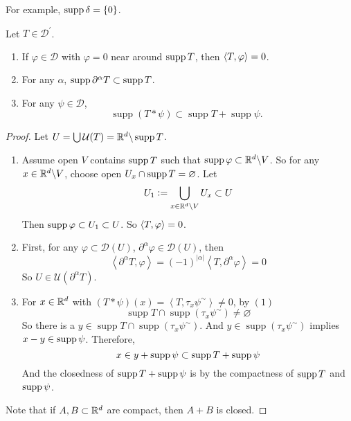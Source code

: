 \begin{enumerate}[label=\arabic*.]
	For example, $\operatorname{supp} \delta = \left\{0\right\}$.

	\begin{prop}
		Let $T \in \mathcal{D}^\prime$.
		\begin{enumerate}[label=(\arabic{*})]
			\item If $\varphi \in \mathcal{D}$ with $\varphi = 0$ near around $\operatorname{supp} T$, then $\langle T,\varphi \rangle = 0$.
			\item For any $\alpha$, $\operatorname{supp} \partial^\alpha T \subset \operatorname{supp} T$.
			\item For any $\psi \in \mathcal{D}$,
			\begin{equation*}
				\operatorname{supp}(T * \psi) \subset \operatorname{supp} T+\operatorname{supp} \psi \text {. }
			\end{equation*}
		\end{enumerate}
	\end{prop}
	\begin{proof}
		Let $U = \bigcup \mathcal{U}(T) = \mathbb{R}^d \backslash \operatorname{supp} T$.
		\begin{enumerate}[label=(\arabic{*})]
			\item Assume open $V$ contains $\operatorname{supp} T$ such that $\operatorname{supp} \varphi \subset \mathbb{R}^d \backslash V$. So for any $x \in \mathbb{R}^d \backslash V$, choose open $U_x \cap \operatorname{supp} T =\varnothing$. Let
			\begin{equation*}
				U_1 \vcentcolon= \bigcup_{x \in \mathbb{R}^d \backslash V}U_x \subset U
			\end{equation*}
			Then $\operatorname{supp} \varphi \subset U_1 \subset U$. So $\langle T,\varphi \rangle = 0$.

			\item First, for any $\varphi \subset \mathcal{D}(U)$, $\partial^\alpha \varphi \in \mathcal{D}(U)$, then
			\begin{equation*}
				\left\langle\partial^\alpha T, \varphi\right\rangle=(-1)^{|\alpha|}\left\langle T, \partial^\alpha \varphi\right\rangle=0
			\end{equation*}
			So $U \in \mathcal{U}(\partial^\alpha T)$.

			\item For $x \in \mathbb{R}^d$ with $(T * \psi)(x)=\left\langle T, \tau_x \psi^{\sim}\right\rangle \neq 0$, by $(1)$
			\begin{equation*}
				\operatorname{supp} T \cap \operatorname{supp}\left(\tau_x \psi^{\sim}\right) \neq \varnothing
			\end{equation*}
			So there is a $y \in \operatorname{supp} T \cap \operatorname{supp}\left(\tau_x \psi^{\sim}\right)$. And $y \in \operatorname{supp}\left(\tau_x \psi^{\sim}\right)$ implies $x - y \in \operatorname{supp} \psi$. Therefore,
			\begin{equation*}
				x \in y + \operatorname{supp} \psi \subset \operatorname{supp} T + \operatorname{supp} \psi
			\end{equation*}
			And the closedness of $\operatorname{supp} T + \operatorname{supp} \psi$ is by the compactness of $\operatorname{supp} T$ and $\operatorname{supp} \psi$.
		\end{enumerate}
		Note that if $A,B \subset \mathbb{R}^d$ are compact, then $A+B$ is closed.
	\end{proof}


\end{enumerate}

